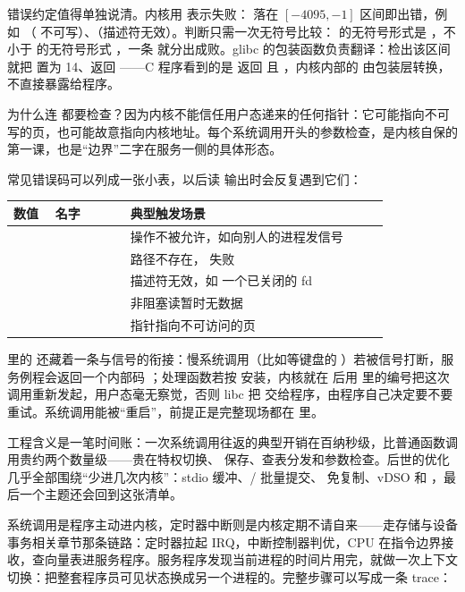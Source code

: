 错误约定值得单独说清。内核用  表示失败： 落在 $[-4095,-1]$ 区间即出错，例如 （ 不可写）、（描述符无效）。判断只需一次无符号比较： 的无符号形式是 ，不小于  的无符号形式 ，一条  就分出成败。glibc 的包装函数负责翻译：检出该区间就把  置为 14、返回 ——C 程序看到的是  返回  且 ，内核内部的  由包装层转换，不直接暴露给程序。

为什么连  都要检查？因为内核不能信任用户态递来的任何指针：它可能指向不可写的页，也可能故意指向内核地址。每个系统调用开头的参数检查，是内核自保的第一课，也是“边界”二字在服务一侧的具体形态。

常见错误码可以列成一张小表，以后读  输出时会反复遇到它们：

\begin{longtable}{L{0.10\linewidth}L{0.18\linewidth}L{0.62\linewidth}}
\toprule
数值 & 名字 & 典型触发场景 \\
\midrule
{} &  & 操作不被允许，如向别人的进程发信号 \\\tablerowrule
{} &  & 路径不存在， 失败 \\\tablerowrule
{} &  & 描述符无效，如  一个已关闭的 fd \\\tablerowrule
{} &  & 非阻塞读暂时无数据 \\\tablerowrule
{} &  & 指针指向不可访问的页 \\
\bottomrule
\end{longtable}

 里的  还藏着一条与信号的衔接：慢系统调用（比如等键盘的 ）若被信号打断，服务例程会返回一个内部码 ；处理函数若按  安装，内核就在  后用  里的编号把这次调用重新发起，用户态毫无察觉，否则 libc 把  交给程序，由程序自己决定要不要重试。系统调用能被“重启”，前提正是完整现场都在  里。

工程含义是一笔时间账：一次系统调用往返的典型开销在百纳秒级，比普通函数调用贵约两个数量级——贵在特权切换、 保存、查表分发和参数检查。后世的优化几乎全部围绕“少进几次内核”：stdio 缓冲、/ 批量提交、 免复制、vDSO 和 ，最后一个主题还会回到这张清单。

系统调用是程序主动进内核，定时器中断则是内核定期不请自来——走存储与设备事务相关章节那条链路：定时器拉起 IRQ，中断控制器判优，CPU 在指令边界接收，查向量表进服务程序。服务程序发现当前进程的时间片用完，就做一次上下文切换：把整套程序员可见状态换成另一个进程的。完整步骤可以写成一条 trace：

